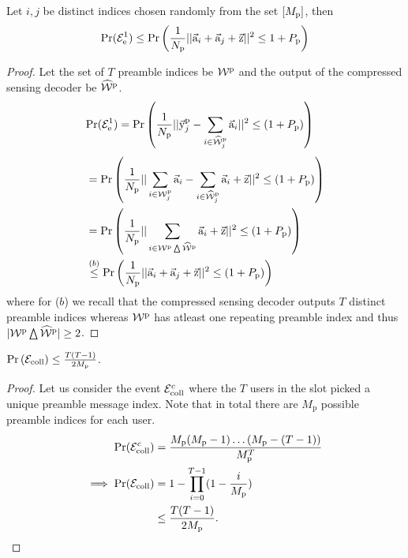 \begin{corollary}
\label{lem:energytest_pass}
Let $i,j$ be distinct indices chosen randomly from the set $[M_{\mathrm{p}}]$, then
\[
\mathrm{Pr}(\mathcal{E}_{\mathrm{e}}^1)\leq \mathrm{Pr}\left( \frac{1}{N_{\mathrm{p}}}||\vec{\mathrm{a}}_i+\vec{\mathrm{a}}_j+\vec{\mathrm{z}}||^2\leq 1+P_{\mathrm{p}}\right)
\]
\end{corollary}
\begin{proof}
Let the set of $T$ preamble indices be $\mathcal{W}^{\mathrm{p}}$ and the output of the compressed sensing decoder be $\widehat{\mathcal{W}}^{\mathrm{p}}$.
\begin{align*}
\mathrm{Pr}(\mathcal{E}_{\mathrm{e}}^1)&=\mathrm{Pr}\left(\frac{1}{N_{\mathrm{p}}}||\vec{\mathrm{y}}_j^{\mathrm{p}}-\sum_{i\in\widehat{\mathcal{W}}_j^{\mathrm{p}}}\vec{\mathrm{a}}_i||^2 \leq (1+P_{\mathrm{p}})\right)
\end{align*}
\begin{align*}
&=\mathrm{Pr}\left(\frac{1}{N_{\mathrm{p}}}||\sum_{i\in\mathcal{W}_j^{\mathrm{p}}}\vec{\mathrm{a}}_i-\sum_{i\in\widehat{\mathcal{W}}_j^{\mathrm{p}}}\vec{\mathrm{a}}_i+\vec{\mathrm{z}}||^2 \leq (1+P_{\mathrm{p}})\right)\\
&=\mathrm{Pr}\left(\frac{1}{N_{\mathrm{p}}}||\sum_{i\in\mathcal{W}^{\mathrm{p}} \bigtriangleup\widehat{\mathcal{W}}^{\mathrm{p}} }\vec{\mathrm{a}}_i +\vec{\mathrm{z}}||^2 \leq (1+P_{\mathrm{p}})\right)\\
&\stackrel{(b)}{\leq}\mathrm{Pr}\left(\frac{1}{N_{\mathrm{p}}}||\vec{\mathrm{a}}_i +\vec{\mathrm{a}}_j +\vec{\mathrm{z}}||^2 \leq (1+P_{\mathrm{p}})\right)
\end{align*} 
where for ($b$) we recall that the compressed sensing decoder outputs $T$ distinct preamble indices whereas $\mathcal{W}^{\mathrm{p}}$ has atleast one repeating preamble index and thus $|\mathcal{W}^{\mathrm{p}} \bigtriangleup\widehat{\mathcal{W}}^{\mathrm{p}}|\geq 2$. 
\end{proof}

\begin{lemma}
$\mathrm{Pr} \left(\mathcal{E}_{\text{coll}}\right)\leq \frac{T(T-1)}{2M_\mathrm{p}}$.
\label{lem:hashCollision}
\end{lemma}
\begin{proof}
Let us consider the event $\mathcal{E}_{\text{coll}}^c$ where the $T$ users in the slot picked a unique preamble message index. Note that in total there are $M_\mathrm{p}$ possible preamble indices for each user.
\begin{align}
\mathrm{Pr}(\mathcal{E}_{\text{coll}}^c)&=\frac{M_\mathrm{p}(M_\mathrm{p}-1)\ldots(M_\mathrm{p}-(T-1))}{M_\mathrm{p}^{T}}\notag\\
\implies \mathrm{Pr}(\mathcal{E}_{\text{coll}})&=1-\prod_{i=0}^{T-1}(1-\frac{i}{M_\mathrm{p}})\notag\\
&\leq \frac{T(T-1)}{2M_\mathrm{p}}.\label{eqn:Hashcollision}
\end{align}
\end{proof}

